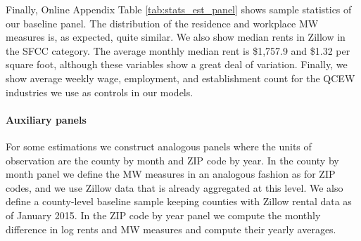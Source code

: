 Finally, Online Appendix Table \ref{tab:stats_est_panel} shows sample statistics 
of our baseline panel.
The distribution of the residence and workplace MW measures is, as expected,
quite similar.
We also show median rents in Zillow in the SFCC category.
The average monthly median rent is \$1,757.9 and \$1.32 per square foot, 
although these variables show a great deal of variation.
Finally, we show average weekly wage, employment, and establishment count 
for the QCEW industries we use as controls in our models.

\paragraph{Auxiliary panels}

For some estimations we construct analogous panels where the units of 
observation are the county by month and ZIP code by year.
In the county by month panel we define the MW measures in an analogous fashion 
as for ZIP codes, and we use Zillow data that is already aggregated at this 
level.
We also define a county-level baseline sample keeping counties with Zillow 
rental data as of January 2015.
In the ZIP code by year panel we compute the monthly difference in log rents 
and MW measures and compute their yearly averages.
